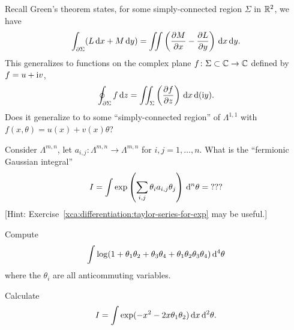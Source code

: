 \begin{puzzle}
Recall Green's theorem states, for some simply-connected region $\Sigma$ in $\mathbb{R}^{2}$,
we have
\begin{equation}
\int_{\partial\Sigma}(L\,\mathrm{d} x+M\,\mathrm{d} y) = \iint\left(\frac{\partial M}{\partial x}-\frac{\partial L}{\partial y}\right)\,\mathrm{d} x\,\mathrm{d} y.
\end{equation}
This generalizes to functions on the complex plane $f\colon\Sigma\subset\mathbb{C}\to\mathbb{C}$
defined by $f=u+\mathrm{i} v$,
\begin{equation}
\oint_{\partial\Sigma}f\,\mathrm{d} z = \iint_{\Sigma}\left(\frac{\partial f}{\partial
  z}\right)\,\mathrm{d} x\,\mathrm{d}(\mathrm{i} y).
\end{equation}
Does it generalize to to some ``simply-connected region'' of
$\Lambda^{1,1}$ with $f(x,\theta)=u(x)+v(x)\theta$?
\end{puzzle}

\begin{puzzle}
Consider $\Lambda^{m,n}$, let
$a_{i,j}\colon\Lambda^{m,n}\to\Lambda^{m,n}$ for $i,j=1,\dots,n$.
What is the ``fermionic Gaussian integral''
\begin{equation}
I =
\int\exp\left(\sum_{i,j}\theta_{i}a_{i,j}\theta_{j}\right)\,\mathrm{d}^{n}\theta
= \mathbf{???}
\end{equation}
[Hint: Exercise~\ref{xca:differentiation:taylor-series-for-exp} may be useful.]
\end{puzzle}



\begin{exercise}[A.~Schwarz 2008]
  Compute
  \begin{equation}
\int\log(1 + \theta_{1}\theta_{2} + \theta_{3}\theta_{4}
+ \theta_{1}\theta_{2}\theta_{3}\theta_{4})\,\mathrm{d}^{4}\theta
  \end{equation}
where the $\theta_{i}$ are all anticommuting variables.
\end{exercise}

\begin{exercise}[A.~Schwarz 2008]
  Calculate
  \begin{equation}
I = \int\exp(-x^{2}-2x\theta_{1}\theta_{2})\,\mathrm{d} x\,\mathrm{d}^{2}\theta.
  \end{equation}
\end{exercise}

